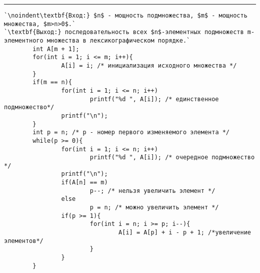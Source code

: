 \vspace{5pt} \hrule

\begin{lstlisting}[caption={Генерация $n$-элементарных подмножеств $m$-элементарного множества}, label=p192, escapechar=`]
`\noindent\textbf{Вход:} $n$ - мощность подмножества, $m$ - мощность множества, $m>n>0$.`
`\textbf{Выход:} последовательность всех $n$-элементных подмножеств m-элементного множества в лексикографическом порядке.`
        int A[m + 1];
        for(int i = 1; i <= m; i++){
                A[i] = i; /* инициализация исходного множества */
        }
        if(m == n){
                for(int i = 1; i <= n; i++)
                        printf("%d ", A[i]); /* единственное подмножество*/
                printf("\n");
        }
        int p = n; /* p - номер первого изменяемого элемента */
        while(p >= 0){
                for(int i = 1; i <= n; i++)
                        printf("%d ", A[i]); /* очередное подмножество */
                printf("\n");
                if(A[n] == m)
                        p--; /* нельзя увеличить элемент */
                else
                        p = n; /* можно увеличить элемент */
                if(p >= 1){
                        for(int i = n; i >= p; i--){
                                A[i] = A[p] + i - p + 1; /*увеличение элементов*/
                        }
                }
        }
\end{lstlisting}
